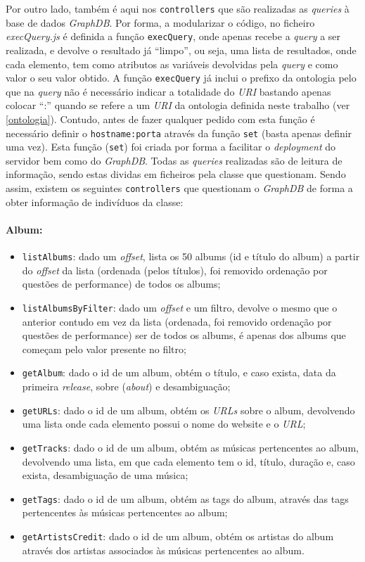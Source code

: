 \documentclass{article}
\begin{document}
Por outro lado, também é aqui nos \texttt{controllers} que são realizadas as \textit{queries} à base de dados \textit{GraphDB}. Por forma, a modularizar o código, no ficheiro \textit{execQuery.js} é definida a função \texttt{execQuery}, onde apenas recebe a \textit{query} a ser realizada, e devolve o resultado já ``limpo'', ou seja, uma lista de resultados, onde cada elemento, tem como atributos as variáveis devolvidas pela \textit{query} e como valor o seu valor obtido. A função \texttt{execQuery} já inclui o prefixo da ontologia pelo que na \textit{query} não é necessário indicar a totalidade do \textit{URI} bastando apenas colocar ``:'' quando se refere a um \textit{URI} da ontologia definida neste trabalho (ver \ref{ontologia}). Contudo, antes de fazer qualquer pedido com esta função é necessário definir o \texttt{hostname:porta} através da função \texttt{set} (basta apenas definir uma vez). Esta função (\texttt{set}) foi criada por forma a facilitar o \textit{deployment} do servidor bem como do \textit{GraphDB}. Todas as \textit{queries} realizadas são de leitura de informação, sendo estas dividas em ficheiros pela classe que questionam. Sendo assim, existem os seguintes \texttt{controllers} que questionam o \textit{GraphDB} de forma a obter informação de indivíduos da classe:

\paragraph{\textbf{Album:}}
    \begin{itemize}
        \item \texttt{listAlbums}: dado um \textit{offset}, lista os 50 albums (id e título do album) a partir do \textit{offset} da lista (ordenada (pelos títulos), foi removido ordenação por questões de performance) de todos os albums;
        \item \texttt{listAlbumsByFilter}: dado um \textit{offset} e um filtro, devolve o mesmo que o anterior contudo em vez da lista (ordenada, foi removido ordenação por questões de performance) ser de todos os albums, é apenas dos albums que começam pelo valor presente no filtro;
        \item \texttt{getAlbum}: dado o id de um album, obtém o título, e caso exista, data da primeira \textit{release}, sobre (\textit{about}) e desambiguação;
        \item \texttt{getURLs}: dado o id de um album, obtém os \textit{URLs} sobre o album, devolvendo uma lista onde cada elemento possui o nome do website e o \textit{URL};
        \item \texttt{getTracks}: dado o id de um album, obtém as músicas pertencentes ao album, devolvendo uma lista, em que cada elemento tem o id, título, duração e, caso exista, desambiguação de uma música;
        \item \texttt{getTags}: dado o id de um album, obtém as tags do album, através das tags pertencentes às músicas pertencentes ao album;
        \item \texttt{getArtistsCredit}: dado o id de um album, obtém os artistas do album através dos artistas associados às músicas pertencentes ao album.
    \end{itemize}
\end{document}
